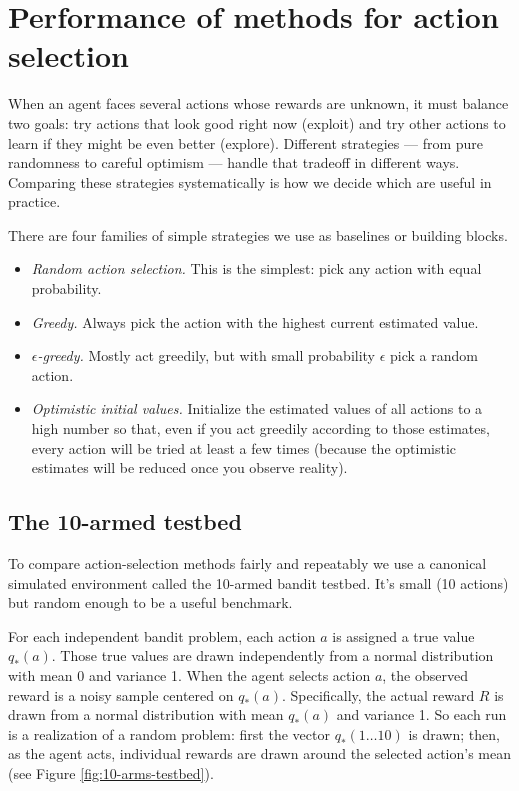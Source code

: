 \chapter{Performance of methods for action selection}
When an agent faces several actions whose rewards are unknown, it must balance two goals: try actions that look good right now (exploit) and try other actions to learn if they might be even better (explore). Different strategies — from pure randomness to careful optimism — handle that tradeoff in different ways. Comparing these strategies systematically is how we decide which are useful in practice.

There are four families of simple strategies we use as baselines or building blocks.
\begin{itemize}
    \item \textit{Random action selection.} This is the simplest: pick any action with equal probability.
    \item \textit{Greedy.} Always pick the action with the highest current estimated value.
    \item \textit{$\epsilon$-greedy.} Mostly act greedily, but with small probability $\epsilon$ pick a random action.
    \item \textit{Optimistic initial values.} Initialize the estimated values of all actions to a high number so that, even if you act greedily according to those estimates, every action will be tried at least a few times (because the optimistic estimates will be reduced once you observe reality).
\end{itemize}

\section{The 10-armed testbed}
To compare action-selection methods fairly and repeatably we use a canonical simulated environment called the 10-armed bandit testbed. It’s small (10 actions) but random enough to be a useful benchmark.

For each independent bandit problem, each action $a$ is assigned a true value $q_*(a)$. Those true values are drawn independently from a normal distribution with mean 0 and variance 1.
When the agent selects action $a$, the observed reward is a noisy sample centered on $q_*(a)$. Specifically, the actual reward $R$ is drawn from a normal distribution with mean $q_*(a)$ and variance 1.
So each run is a realization of a random problem: first the vector $q_*(1\ldots 10)$ is drawn; then, as the agent acts, individual rewards are drawn around the selected action’s mean (see Figure \ref{fig:10-arms-testbed}).

